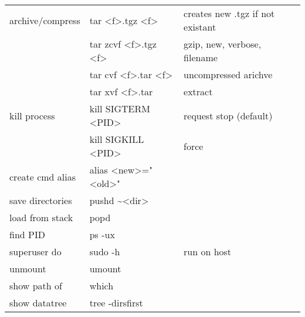 {\begin{tabularx}{\linewidth}{@{} l>{\ttfamily}lX @{}}
    archive/compress   & tar <f>.tgz <f>            & creates new .tgz if not existant \\
                       & tar zcvf <f>.tgz <f>       & gzip, new, verbose, filename     \\
                       & tar cvf <f>.tar <f>        & uncompressed arichve             \\
                       & tar xvf <f>.tar            & extract                          \\
    kill process       & kill SIGTERM <PID>         & request stop (default)           \\
                       & kill SIGKILL <PID>         & force                            \\
    create cmd alias   & alias <new>="<old>"        &                                  \\
    save directories   & pushd \textasciitilde<dir> &                                  \\
    load from stack    & popd                       &                                  \\
    find PID           & ps -ux                     &                                  \\
    superuser do       & sudo -h                    & run on host                      \\
    unmount            & umount                     &                                  \\
    show path of       & which                      &                                  \\
    show datatree      & tree -dirsfirst            &                                  \\
    \bottomrule
\end{tabularx}

} %



